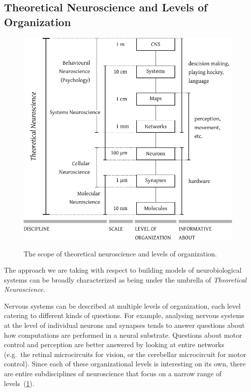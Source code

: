 \documentclass[10pt,letterpaper,oneside]{article}
\begin{document}
\subsection{Theoretical Neuroscience and Levels of Organization}

\begin{figure}[t]
	\centering
	\includegraphics{media/levels.pdf}\\
	\caption{The scope of theoretical neuroscience and levels of organization.}
	\label{fig:levels}
\end{figure}

The approach we are taking with respect to building models of neurobiological systems can be broadly characterized as being under the umbrella of \emph{Theoretical Neuroscience}.

Nervous systems can be described at multiple levels of organization, each level catering to different kinds of questions. For example, analysing nervous systems at the level of individual neurons and synapses tends to answer questions about how computations are performed in a neural substrate. Questions about motor control and perception are better answered by looking at entire  networks (e.g.~the retinal microcircuits for vision, or the cerebellar microcircuit for motor control). Since each of these organizational levels is interesting on its own, there are entire subdisciplines of neuroscience that focus on a narrow range of levels~(\cref{fig:levels}).
\end{document}

